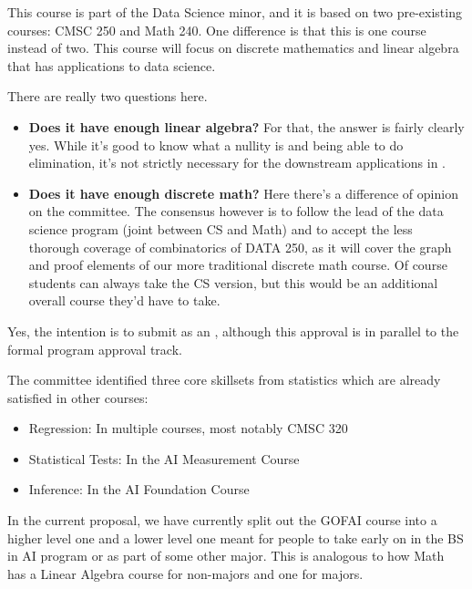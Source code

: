 

This course is part of the Data Science minor, and it is based on two pre-existing courses: CMSC 250 and
Math 240. One difference is that this is one course instead of two. This course will focus on discrete
mathematics and linear algebra that has applications to data science. 

There are really two questions here.  
\begin{itemize}
    \item {\bf Does it have enough linear algebra?}  For that, the answer is fairly clearly yes.  While it's good to know what a nullity is and being able to do elimination, it's not strictly necessary for the downstream applications in \ai{}.
    \item {\bf Does it have enough discrete math?}  Here there's a difference of opinion on the committee.  The consensus however is to follow the lead of the data science program (joint between CS and Math) and to accept the less thorough coverage of combinatorics of DATA 250, as it will cover the graph and proof elements of our more traditional discrete math course.  Of course students can always take the CS version, but this would be an additional overall course they'd have to take.
\end{itemize}



Yes, the intention is to submit as an , although this approval is in parallel to the formal program approval track.


The committee identified three core skillsets from statistics which are already satisfied in other courses:
\begin{itemize}
    \item Regression: In multiple courses, most notably CMSC 320
    \item Statistical Tests: In the AI Measurement Course
    \item Inference: In the AI Foundation Course
\end{itemize}


In the current proposal, we have currently split out the GOFAI course into a higher level one and a lower level one meant for people to take early on in the BS in AI program or as part of some other major.  This is analogous to how Math has a Linear Algebra course for non-majors and one for majors.

